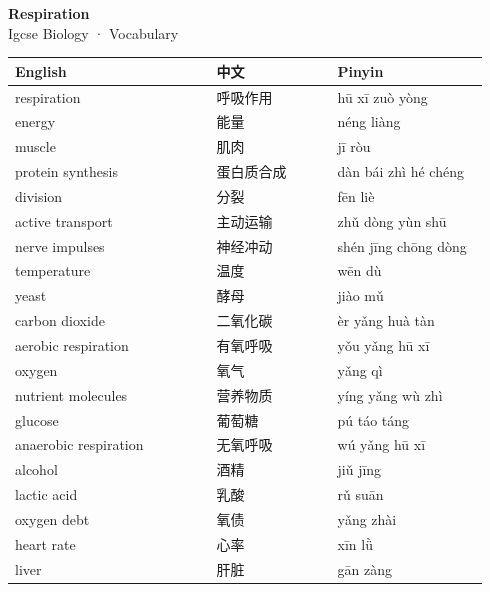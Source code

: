\documentclass[11pt]{article}
\begin{document}
\begin{center}
  {\LARGE\bfseries Respiration}\\[0.35em]
  {\large Igcse Biology · Vocabulary}
\end{center}
\vspace{0.6em}

\begin{longtable}{@{}p{0.40\linewidth}p{0.24\linewidth}p{0.30\linewidth}@{}}
\toprule
\textbf{English} & \textbf{中文} & \textbf{Pinyin} \\
\midrule
\endhead
\bottomrule
\endlastfoot
respiration & 呼吸作用 & hū xī zuò yòng \\
energy & 能量 & néng liàng \\
muscle & 肌肉 & jī ròu \\
protein synthesis & 蛋白质合成 & dàn bái zhì hé chéng \\
division & 分裂 & fēn liè \\
active transport & 主动运输 & zhǔ dòng yùn shū \\
nerve impulses & 神经冲动 & shén jīng chōng dòng \\
temperature & 温度 & wēn dù \\
yeast & 酵母 & jiào mǔ \\
carbon dioxide & 二氧化碳 & èr yǎng huà tàn \\
aerobic respiration & 有氧呼吸 & yǒu yǎng hū xī \\
oxygen & 氧气 & yǎng qì \\
nutrient molecules & 营养物质 & yíng yǎng wù zhì \\
glucose & 葡萄糖 & pú táo táng \\
anaerobic respiration & 无氧呼吸 & wú yǎng hū xī \\
alcohol & 酒精 & jiǔ jīng \\
lactic acid & 乳酸 & rǔ suān \\
oxygen debt & 氧债 & yǎng zhài \\
heart rate & 心率 & xīn lǜ \\
liver & 肝脏 & gān zàng \\
\end{longtable}
\end{document}
